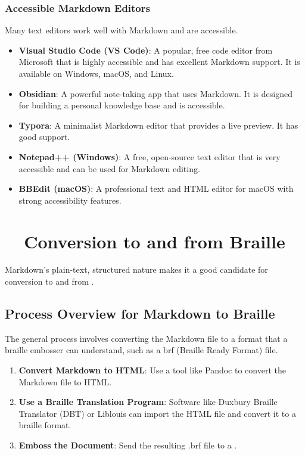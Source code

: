 \subsubsection{Accessible Markdown Editors}
\label{ssubsec:accessible-markdown-editors-details}
Many text editors work well with Markdown and are accessible.
\begin{itemize}
	\item \textbf{Visual Studio Code (VS Code)}: A popular, free code editor from Microsoft that is highly accessible and has excellent Markdown support. It is available on Windows, macOS, and Linux.
	\item \textbf{Obsidian}: A powerful note-taking app that uses Markdown. It is designed for building a personal knowledge base and is accessible.
	\item \textbf{Typora}: A minimalist Markdown editor that provides a live preview. It has good  support.
	\item \textbf{Notepad++ (Windows)}: A free, open-source text editor that is very accessible and can be used for Markdown editing.
	\item \textbf{BBEdit (macOS)}: A professional text and HTML editor for macOS with strong accessibility features.
\end{itemize}

\section{~~Conversion to and from Braille}
\label{sec:markdown-braille-conversion}
Markdown's plain-text, structured nature makes it a good candidate for conversion to and from .

\subsection{Process Overview for Markdown to Braille}
\label{subsec:markdown-to-braille}
The general process involves converting the Markdown file to a format that a \gls{braille} embosser can understand, such as a \gls{brf} (Braille Ready Format) file.
\begin{enumerate}
	\item \textbf{Convert Markdown to HTML}: Use a tool like Pandoc to convert the Markdown file to HTML.
	\item \textbf{Use a Braille Translation Program}: Software like Duxbury Braille Translator (DBT) or Liblouis can import the HTML file and convert it to a braille format.
	\item \textbf{Emboss the Document}: Send the resulting .brf file to a .
\end{enumerate}

